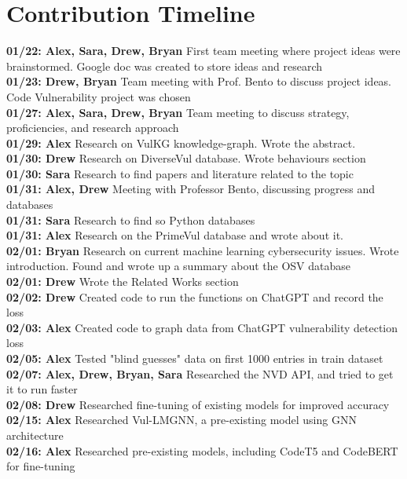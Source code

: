 \documentclass{article}
\begin{document}
\section{Contribution Timeline}
\textbf{01/22: Alex, Sara, Drew, Bryan} First team meeting where project ideas were
brainstormed. Google doc was created to store ideas and research \\
\textbf{01/23: Drew, Bryan} Team meeting with Prof. Bento to discuss project ideas.
Code Vulnerability project was chosen \\
\textbf{01/27: Alex, Sara, Drew, Bryan} Team meeting to discuss strategy, proficiencies, 
and research approach \\
\textbf{01/29: Alex} Research on VulKG knowledge-graph. Wrote the abstract. \\
\textbf{01/30: Drew} Research on DiverseVul database. Wrote behaviours section \\
\textbf{01/30: Sara} Research to find papers and literature related to the topic \\
\textbf{01/31: Alex, Drew} Meeting with Professor Bento, discussing progress and databases \\
\textbf{01/31: Sara} Research to find so Python databases \\
\textbf{01/31: Alex} Research on the PrimeVul database and wrote about it. \\
\textbf{02/01: Bryan} Research on current machine learning cybersecurity issues. Wrote
introduction. Found and wrote up a summary about the OSV database \\
\textbf{02/01: Drew} Wrote the Related Works section \\
\textbf{02/02: Drew} Created code to run the functions on ChatGPT and record the loss \\
\textbf{02/03: Alex} Created code to graph data from ChatGPT vulnerability detection loss \\
\textbf{02/05: Alex} Tested "blind guesses" data on first 1000 entries in train dataset \\
\textbf{02/07: Alex, Drew, Bryan, Sara} Researched the NVD API, and tried to get it to run faster \\
\textbf{02/08: Drew} Researched fine-tuning of existing models for improved accuracy \\
\textbf{02/15: Alex} Researched Vul-LMGNN, a pre-existing model using GNN architecture \\
\textbf{02/16: Alex} Researched pre-existing models, including CodeT5 and CodeBERT for fine-tuning \\
\end{document}
